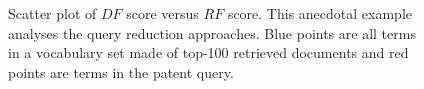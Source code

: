 \begin{figure}[t!]

\begin{centering}
 \hspace*{.1cm} 
\par\end{centering} 

\protect\caption{Scatter plot of $\mathit{DF}$ score versus $\mathit{RF}$ score. This anecdotal example analyses the query reduction approaches. Blue points are all terms in a vocabulary set made of top-100 retrieved documents and red points are terms in the patent query.}
\label{fig:scatter_combined}
\end{figure}
